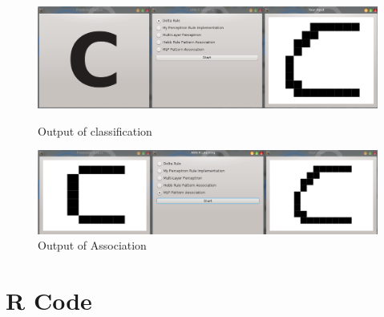 \documentclass[a4paper,12pt]{report}
\begin{document}
\begin{landscape}
 \begin{figure}
 \includegraphics[width=\linewidth]{classificationoutput.png}
 \caption{Output of classification} 
 
 \includegraphics[width=\linewidth]{associationoutput.png}
 \caption{Output of Association} 
 \end{figure}
\end{landscape}
\restoregeometry
%

\section*{R Code}
\end{document}
